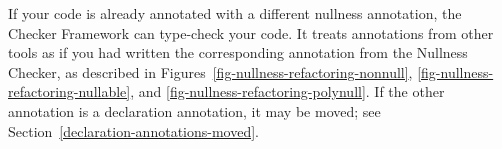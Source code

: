 If your code is already annotated with a different nullness
annotation, the Checker Framework can type-check your code.
It treats annotations from other tools
as if you had written the corresponding annotation from the
Nullness Checker, as described in Figures~\ref{fig-nullness-refactoring-nonnull},
\ref{fig-nullness-refactoring-nullable}, and
\ref{fig-nullness-refactoring-polynull}.
If the other annotation is a declaration annotation, it may be moved; see
Section~\ref{declaration-annotations-moved}.



